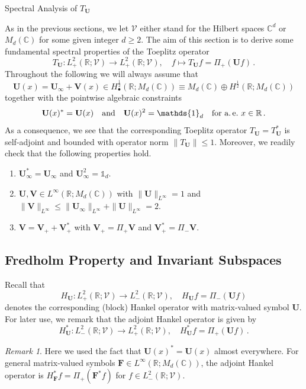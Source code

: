 \documentclass[11pt,reqno]{amsart}
\makeatletter
\theoremstyle{definition}
\theoremstyle{remark}
\theoremstyle{remark}
\newtheorem*{remark*}{Remark}
\numberwithin{equation}{section}
\newcommand{\C}{\mathbb{C}}
\newcommand{\R}{\mathbb{R}}
\newcommand{\VV}{\mathcal{V}}
\newcommand{\Vb}{\mathbf{V}}
\newcommand{\Ub}{\mathbf{U}}
\def\section{\@startsection{section}{1}%
  \z@{1.5\linespacing\@plus\linespacing}{.5\linespacing}%
  {\normalfont\bfseries\large\centering}}
\makeatother
\begin{document}

\section{Spectral Analysis of $T_{\Ub}$}

\label{sec:spectral}

As in the previous sections, we let $\VV$ either stand for the Hilbert spaces $\C^d$ or $M_d(\C)$ for some given integer $d \geq 2$. The aim of this section is to derive some fundamental spectral properties of the Toeplitz operator 
$$
T_\Ub : L^2_+(\R; \VV) \to L^2_+(\R; \VV), \quad f \mapsto T_\Ub f= \Pi_+(\Ub f) \, .
$$ 
Throughout the following we will always assume that 
$$
\Ub(x) = \Ub_\infty + \Vb(x) \in H^{\frac 1 2}_\bullet(\R; M_d(\C))  \equiv M_d(\C) \oplus H^{\frac{1}{2}}(\R; M_d(\C))
$$ 
together with the pointwise algebraic constraints
$$
\Ub(x)^* = \Ub(x) \quad \mbox{and} \quad \Ub(x)^2 = \mathds{1}_d \quad \mbox{for a.\,e.~$x \in \R$} \, .
$$ 
As a consequence,  we see that the corresponding Toeplitz operator $T_{\Ub}=T_{\Ub}^*$ is self-adjoint and bounded with operator norm $\| T_{\Ub} \| \leq 1$. Moreover, we readily check that the following properties hold.
\begin{enumerate}
\item[(i)] $\Ub_\infty^* = \Ub_\infty$ and $\Ub_\infty^2 = \mathds{1}_d$.
\item[(ii)] $\Ub, \Vb \in L^\infty(\R; M_d(\C))$ with $\|\Ub \|_{L^\infty} = 1$ and $\|\Vb \|_{L^\infty} \leq \|\Ub_\infty\|_{L^\infty} + \| \Ub \|_{L^\infty} = 2$.
\item[(iii)] $\Vb = \Vb_{+} + \Vb_{+}^*$ with $\Vb_{+} = \Pi_+ \Vb$ and $\Vb_{+}^* = \Pi_- \Vb$.
\end{enumerate}


\subsection*{Fredholm Property and Invariant Subspaces}

Recall that 
$$
H_\Ub: L^2_+(\R; \VV) \to L^2_-(\R; \VV), \quad H_{\Ub} f= \Pi_-(\Ub f)
$$ 
denotes the corresponding (block) Hankel operator with matrix-valued symbol $\Ub$. For later use, we remark that the adjoint Hankel operator is given by
$$
H_\Ub^* : L^2_-(\R; \VV) \to L^2_+(\R;\VV), \quad H_\Ub^* f = \Pi_+(\Ub f) \, .
$$
\begin{remark*}
Here we used the fact that $\Ub(x)^* =  \Ub(x)$ almost everywhere. For general matrix-valued symbols $\mathbf{F}\in L^\infty(\R; M_d(\C))$, the adjoint Hankel operator is $H_{\mathbf{F}}^* f = \Pi_+(\mathbf{F}^* f)$ for $f\in L^2_-(\R;\VV)$.
\end{remark*}
\end{document}
